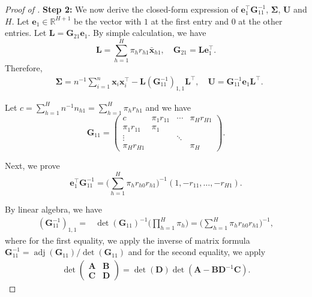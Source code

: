 \documentclass[12pt]{article}
\newcommand{\bs}{\boldsymbol}
\begin{document}
\begin{proof}[Proof of ]
\noindent \textbf{Step 2:} We now derive the closed-form expression of $\bs{e}_1^\top  \bs{G}_{11}^{-1}$, $\bs{\Sigma}$, $\bs{U}$ and $H$. Let $\bs{e}_{1} \in \mathbb{R}^{H+1}$ be the vector with $1$ at the first entry and $0$ at the other entries. Let $\bs{L}=  \bs{G}_{21}\bs{e}_{1}$. By simple calculation, we have $$\bs{L} = \sum_{h=1}^H \pi_h r_{h1}\bar{\bs{x}}_{h1},\quad \bs{G}_{21}  = \bs{L}\bs{e}_1^\top.$$ 
Therefore,
\begin{align*}
    &\bs{\Sigma} = n^{-1} \sum_{i=1}^n \bs{x}_i \bs{x}_i^\top - \bs{L}(\bs{G}_{11}^{-1})_{1,1}\bs{L}^\top,\quad \bs{U}= \bs{G}_{11}^{-1} \bs{e}_{1} \bs{L}^\top  .
\end{align*}

Let $c = \sum_{h=1}^H n^{-1} n_{h1} = \sum_{h=1}^H \pi_h r_{h1}$ and we have
\[
\bs{G}_{11} = \begin{pmatrix}
    c & \pi_{1} r_{11} & \cdots & \pi_{H} r_{H1} \\
    \pi_{1} r_{11} & \pi_1 & &\\
    \vdots & & \ddots & \\
    \pi_{H} r_{H1}  & & & \pi_H
\end{pmatrix}.
\]

Next, we prove
$$\bs{e}_1^\top  \bs{G}_{11}^{-1} = \Big(\sum_{h=1}^H \pi_{h} r_{h0} r_{h1}\Big)^{-1}(1,-r_{11},\ldots, -r_{H1}).$$

By linear algebra, we have
\begin{align*}
    (\bs{G}_{11}^{-1})_{1,1}  =& \det(\bs{G}_{11})^{-1}\Big(\prod_{h=1}^H \pi_{h}\Big) = 
    \Big(\sum_{h=1}^H \pi_{h} r_{h0} r_{h1} \Big)^{-1},
\end{align*}
where for the first equality, we apply the inverse of matrix formula $\bs{G}_{11}^{-1} = \operatorname{adj} (\bs{G}_{11}) /\operatorname{det}(\bs{G}_{11})$ and for the second equality, we apply 
\begin{align*}
\det\begin{pmatrix}\bs{A}&\bs{B}\\\bs{C}&\bs{D}\end{pmatrix} = \det(\bs{D})\det(\bs{A}-\bs{B}\bs{D}^{-1}\bs{C}).
\end{align*}



\end{proof}
\end{document}
